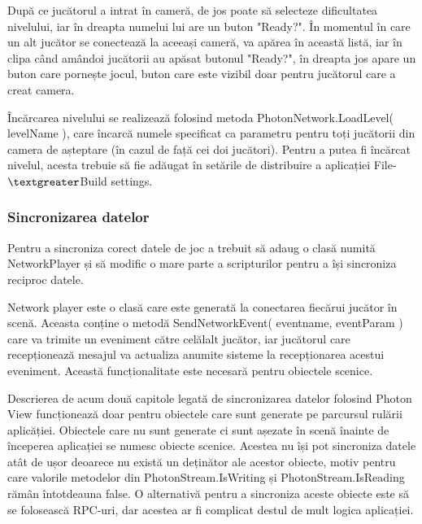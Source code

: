 \documentclass[12pt, a4paper]{article}
\begin{document}
	După ce jucătorul a intrat în cameră, de jos poate să selecteze dificultatea nivelului, iar în dreapta numelui lui are un buton "Ready?". În momentul în care un alt jucător se conectează la aceeași cameră, va apărea în această listă, iar în clipa când amândoi jucătorii au apăsat butonul "Ready?", în dreapta jos apare un buton care pornește jocul, buton care este vizibil doar pentru jucătorul care a creat camera.
	\newline
	
	Încărcarea nivelului se realizează folosind metoda PhotonNetwork.LoadLevel( levelName ), care încarcă numele specificat ca parametru pentru toți jucătorii din camera de așteptare (în cazul de față cei doi jucători). Pentru a putea fi încărcat nivelul, acesta trebuie să fie adăugat în setările de distribuire a aplicației File-$\textgreater$Build settings.
	
	
	
	
	
	\subsubsection{Sincronizarea datelor}
	\label{section: dataSync}
	
	Pentru a sincroniza corect datele de joc a trebuit să adaug o clasă numită NetworkPlayer și să modific o mare parte a scripturilor pentru a își sincroniza reciproc datele.
	\newline
	
	Network player este o clasă care este generată la conectarea fiecărui jucător în scenă. Aceasta conține o metodă SendNetworkEvent( eventname, eventParam ) care va trimite un eveniment către celălalt jucător, iar jucătorul care recepționează mesajul va actualiza anumite sisteme la recepționarea acestui eveniment. Această funcționalitate este necesară pentru obiectele scenice.
	\newline
	
	Descrierea de acum două capitole legată de sincronizarea datelor folosind Photon View funcționează doar pentru obiectele care sunt generate pe parcursul rulării aplicăției. Obiectele care nu sunt generate ci sunt așezate în scenă înainte de începerea aplicației se numesc obiecte scenice. Acestea nu își pot sincroniza datele atât de ușor deoarece nu există un deținător ale acestor obiecte, motiv pentru care valorile metodelor din PhotonStream.IsWriting și PhotonStream.IsReading rămân întotdeauna false. O alternativă pentru a sincroniza aceste obiecte este să se folosească RPC-uri, dar acestea ar fi complicat destul de mult logica aplicației.
	\newline
	
\end{document}
